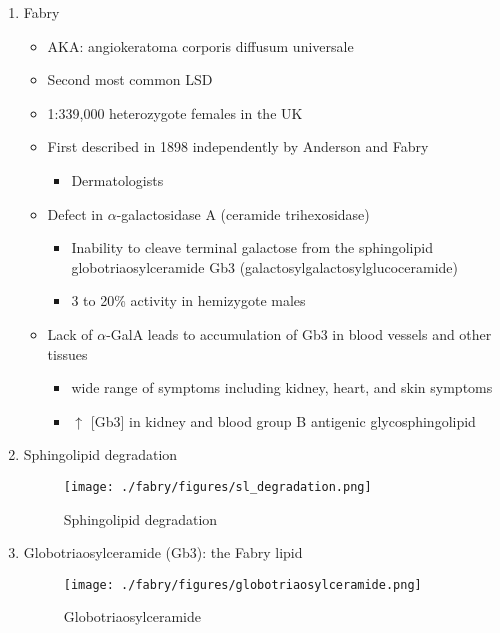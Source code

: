 \documentclass{scrartcl}
\begin{document}
\begin{enumerate}
\item Fabry
\label{sec:orgbd46194}

\begin{itemize}
\item AKA: angiokeratoma corporis diffusum universale
\item Second most common LSD
\item 1:339,000 heterozygote females in the UK
\item First described in 1898 independently by Anderson and Fabry
\begin{itemize}
\item Dermatologists
\end{itemize}
\item Defect in \(\alpha\)-galactosidase A (ceramide trihexosidase)
\begin{itemize}
\item Inability to cleave terminal galactose from the sphingolipid globotriaosylceramide Gb3 (galactosylgalactosylglucoceramide)
\item 3 to 20\% activity in hemizygote males
\end{itemize}
\item Lack of \(\alpha\)-GalA leads to accumulation of Gb3 in blood vessels and other tissues
\begin{itemize}
\item wide range of symptoms including kidney, heart, and skin symptoms
\item \(\uparrow\) [Gb3] in kidney and blood group B antigenic glycosphingolipid
\end{itemize}
\end{itemize}

\item Sphingolipid degradation
\label{sec:org928fe3d}

\begin{figure}[htbp]
\centering
\texttt{[image: ./fabry/figures/sl\_degradation.png]}
\caption[Sphingolipid degradation]{\label{fig:orgf27a445}
Sphingolipid degradation}
\end{figure}


\item Globotriaosylceramide (Gb3): the Fabry lipid
\label{sec:orgd9af483}
\begin{figure}[htbp]
\centering
\texttt{[image: ./fabry/figures/globotriaosylceramide.png]}
\caption[Globotriaosylceramide]{\label{fig:orgd1a4c85}
Globotriaosylceramide}
\end{figure}


\end{enumerate}
\end{document}
